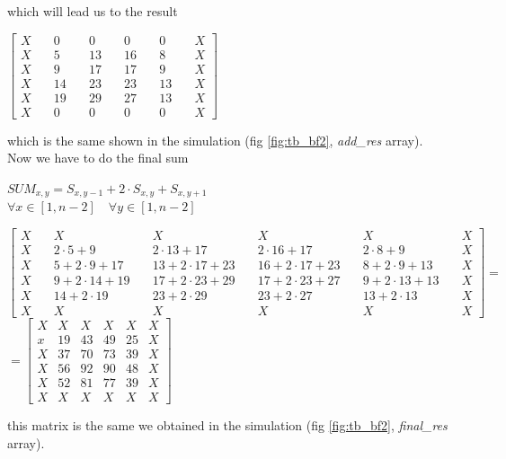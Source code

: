 	which will lead us to the result
	\begin{center}
		$ \begin{bmatrix}
		X&0&0&0&0&X\\
		X\quad&5\quad & 13 \quad& 16\quad & 8\quad&X\\
		X\quad&9\quad &17 \quad& 17\quad & 9  \quad&X 	\\
		X\quad&14\quad&23 \quad&23\quad & 13\quad&X\\
		X\quad&19\quad&29 \quad& 27\quad & 13\quad&X\\
		X&0&0&0&0&X
		\end{bmatrix}$
	\end{center}
	which is the same shown in the simulation (fig \ref{fig:tb_bf2}, \textit{add\_res} array).\\ 	 
	  	Now we have to do the final sum
	  	\begin{center}
	  		$ SUM_{x,y}=S_{x,y-1}+2\cdot S_{x,y}+S_{x,y+1}$\\
	  		$  \forall x\in [1,n-2] \quad\forall y\in [1,n-2] $
	  	\end{center}
	  	\bigskip
	  	\begin{center}
	  		$ \begin{bmatrix}
	  		X & X & X & X &X&X\\
	  		X\quad & 2\cdot5+9\quad& 2\cdot13+17\quad&2\cdot16+17\quad&2\cdot8+9\quad&X\\
	  		X \quad&5+2\cdot9+17\quad& 13+2\cdot17+23\quad & 16+2\cdot17+23 \quad& 8+2\cdot9+13\quad&X   	\\
	  		X\quad&9+2\cdot14+19\quad&17+2\cdot23+29 \quad& 17+2\cdot23+27 \quad& 9+2\cdot13+13\quad&X\\
	  		X\quad & 14+2\cdot19\quad& 23+2\cdot29\quad&23+2\cdot27\quad&13+2\cdot13\quad&X\\
	  		X&X & X & X &X&X
	  		\end{bmatrix} = $
	  		\bigskip$=\begin{bmatrix}
	  	X & X & X & X &X&X\\
	  	x & 19 & 43 & 49 & 25 & X\\
	  	X & 37 &70 & 73 & 39 & X   	\\
	  		X&56 & 92 & 90 & 48& X\\
	  		X&52&81&77&39&X\\
	  		X & X & X & X &X&X
	  		\end{bmatrix}$
	  	\end{center}
	  	this matrix is the same we obtained in the simulation (fig \ref{fig:tb_bf2}, \textit{final\_res} array).
